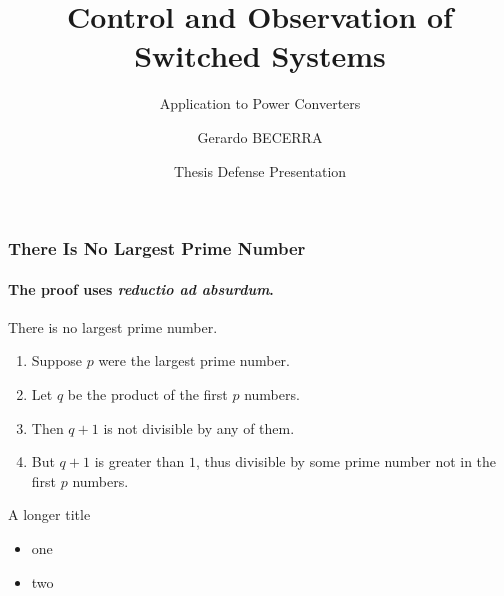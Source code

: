 \documentclass[aspectratio=169]{beamer}
\title{Control and Observation of Switched Systems}
\subtitle{Application to Power Converters}
\date[02/12/2019]{Thesis Defense Presentation}
\author[gbecerra]{Gerardo BECERRA}
\begin{document}
\begin{frame}
\titlepage
\end{frame}

\begin{frame}	 
\frametitle{There Is No Largest Prime Number} 
\framesubtitle{The proof uses \textit{reductio ad absurdum}.} 
\begin{theorem}
There is no largest prime number. \end{theorem} 
\begin{enumerate} 
\item<1-| alert@1> Suppose $p$ were the largest prime number. 
\item<2-> Let $q$ be the product of the first $p$ numbers. 
\item<3-> Then $q+1$ is not divisible by any of them. 
\item<1-> But $q + 1$ is greater than $1$, thus divisible by some prime
number not in the first $p$ numbers.
\end{enumerate}
\end{frame}

\begin{frame}{A longer title}
\begin{itemize}
\item one
\item two
\end{itemize}
\end{frame}
\end{document}
